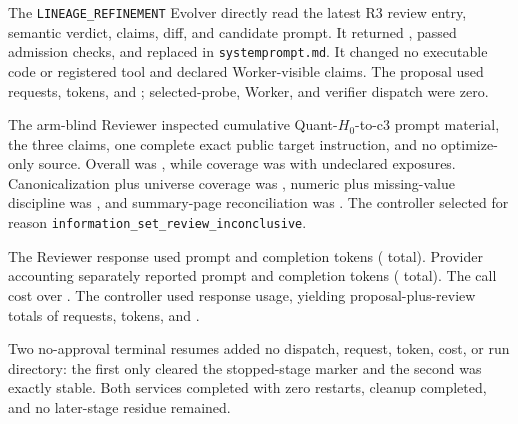 The \texttt{LINEAGE\_REFINEMENT} Evolver directly read the latest R3 review
entry, semantic verdict, claims, diff, and candidate prompt. It returned
\HoldingsRefineRfourProposalDecision{}, passed
\HoldingsRefineRfourProposalAdmission{} admission checks, and replaced
\HoldingsRefineRfourProposalMutation{} in \texttt{systemprompt.md}. It changed
no executable code or registered tool and declared
\HoldingsRefineRfourProposalClaims{} Worker-visible claims. The proposal used
\HoldingsRefineRfourProposalRequests{} requests,
\HoldingsRefineRfourProposalTokens{} tokens, and
\HoldingsRefineRfourProposalCost{}; selected-probe, Worker, and verifier
dispatch were zero.

The arm-blind Reviewer inspected cumulative Quant-$H_0$-to-c3 prompt material,
the three claims, one complete exact public target instruction, and no
optimize-only source. Overall was \HoldingsRefineRfourReviewOverall{}, while
coverage was \HoldingsRefineRfourReviewCoverage{} with
\HoldingsRefineRfourReviewUndeclared{} undeclared exposures. Canonicalization
plus universe coverage was \HoldingsRefineRfourReviewCanonicalization{},
numeric plus missing-value discipline was
\HoldingsRefineRfourReviewNumeric{}, and summary-page reconciliation was
\HoldingsRefineRfourReviewReconciliation{}. The controller selected
\HoldingsRefineRfourDecision{} for reason
\texttt{information\_set\_review\_inconclusive}.

The Reviewer response used \HoldingsRefineRfourReviewResponsePrompt{} prompt
and \HoldingsRefineRfourReviewResponseCompletion{} completion tokens
(\HoldingsRefineRfourReviewResponseTokens{} total). Provider accounting
separately reported \HoldingsRefineRfourReviewProviderPrompt{} prompt and
\HoldingsRefineRfourReviewProviderCompletion{} completion tokens
(\HoldingsRefineRfourReviewProviderTokens{} total). The call cost
\HoldingsRefineRfourReviewCost{} over \HoldingsRefineRfourReviewWall{}. The
controller used response usage, yielding proposal-plus-review totals of
\HoldingsRefineRfourCumulativeRequests{} requests,
\HoldingsRefineRfourCumulativeTokens{} tokens, and
\HoldingsRefineRfourCumulativeCost{}.

Two no-approval terminal resumes added no dispatch, request, token, cost, or run
directory: the first only cleared the stopped-stage marker and the second was
exactly stable. Both services completed with zero restarts, cleanup completed,
and no later-stage residue remained. 

